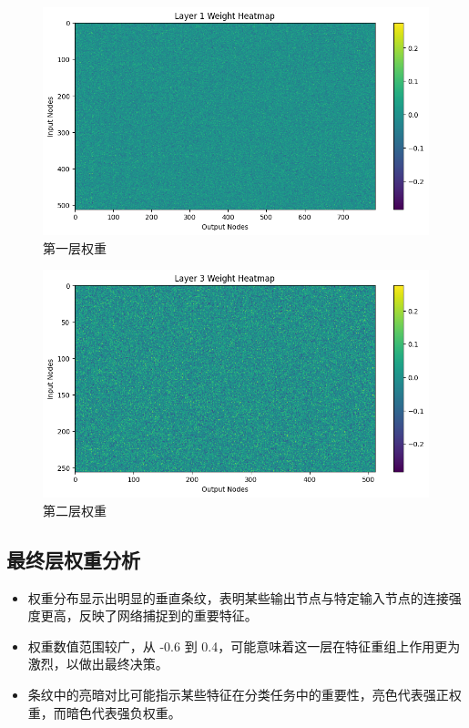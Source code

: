 \documentclass[a4paper,12pt]{article}
\begin{document}
\begin{figure}[H]
    \centering
    \includegraphics[width=1\textwidth]{layer1.png}
    \caption{第一层权重}
    \label{fig:example}
\end{figure}

\begin{figure}[H]
    \centering
    \includegraphics[width=1\textwidth]{layer2.png}
    \caption{第二层权重}
    \label{fig:example}
\end{figure}



\subsection{最终层权重分析}
\begin{itemize}
    \item 权重分布显示出明显的垂直条纹，表明某些输出节点与特定输入节点的连接强度更高，反映了网络捕捉到的重要特征。
    \item 权重数值范围较广，从 -0.6 到 0.4，可能意味着这一层在特征重组上作用更为激烈，以做出最终决策。
    \item 条纹中的亮暗对比可能指示某些特征在分类任务中的重要性，亮色代表强正权重，而暗色代表强负权重。
\end{itemize}
\end{document}
